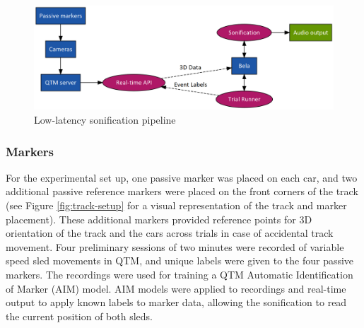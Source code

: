 \documentclass[10pt,a4paper,onecolumn]{article}
\begin{document}
\begin{figure}[h]

{\centering \includegraphics[width=1\linewidth]{figures/exp-graph} 

}

\caption{Low-latency sonification pipeline}\label{fig:exp-graph}
\end{figure}

\hypertarget{markers}{%
\subsubsection{Markers}\label{markers}}

For the experimental set up, one passive marker was placed on each car, and two additional passive reference markers were placed on the front corners of the track (see Figure \ref{fig:track-setup} for a visual representation of the track and marker placement). These additional markers provided reference points for 3D orientation of the track and the cars across trials in case of accidental track movement. Four preliminary sessions of two minutes were recorded of variable speed sled movements in QTM, and unique labels were given to the four passive markers. The recordings were used for training a QTM Automatic Identification of Marker (AIM) model. AIM models were applied to recordings and real-time output to apply known labels to marker data, allowing the sonification to read the current position of both sleds.
\end{document}
